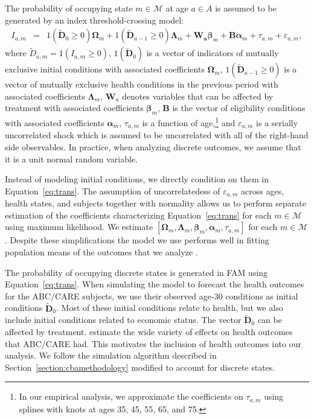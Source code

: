 The probability of occupying state $m \in \mathcal{M}$ at age $a \in{A}$ is assumed to be generated by an index threshold-crossing model:
\begin{eqnarray}
I_{a,m} &=&  \bm{\mathit{1}} \left( \tilde{\bm{D}}_{0} \geq 0 \right) \bm{\Omega}_{m} + \bm{\mathit{1}} \left( \tilde{\bm{D}}_{a-1} \geq 0\right) \bm{\Lambda}_{m} + \bm{W_a} \bm{\beta}_{m} + \bm{B} \bm{\alpha}_m + \tau_{a,m} + \varepsilon_{a,m}, \label{eq:trans}
\end{eqnarray}
where $\tilde{D}_{a,m} = \bm{\mathit{1}}  \left( I_{a,m} \geq 0 \right)$, $\bm{\mathit{1}} \left( \tilde{\bm{D}}_{0} \right)$ is a vector of indicators of mutually exclusive initial conditions with associated coefficients $\bm{\Omega}_{m}$, $ \bm{\mathit{1}} \left( \tilde{\bm{D}}_{a-1} \geq 0\right)$ is a vector of mutually exclusive health conditions in the previous period with associated coefficients $\bm{\Lambda}_{m}$, $\bm{W}_a$ denotes variables that can be affected by treatment with associated coefficients $\bm{\beta}_{m}$, $\bm{B}$ is the vector of eligibility conditions with associated coefficients $\bm{\alpha}_m$, $\tau_{a,m}$ is a function of age,\footnote{In our empirical analysis, we approximate the coefficients on $\tau_{a,m}$ using splines with knots at ages 35, 45, 55, 65, and 75.} and $\varepsilon_{a,m}$ is a serially uncorrelated shock which is assumed to be uncorrelated with all of the right-hand side observables. In practice, when analyzing discrete outcomes, we assume that it is a unit normal random variable.

Instead of modeling initial conditions, we directly condition on them in Equation~\eqref{eq:trans}. The assumption of uncorrelatedess of $\varepsilon_{a,m}$ across ages, health states, and subjects together with normality allows us to perform separate estimation of the coefficients characterizing Equation~\eqref{eq:trans} for each $m \in \mathcal{M}$ using maximum likelihood. We estimate $\left[   \bm{\Omega}_{m}, \bm{\Lambda}_{m}, \bm{\beta}_{m}, \bm{\alpha}_{m}, \tau_{a,m}  \right]$ for each $m \in \mathcal{M}$. Despite these simplifications the model we use performs well in fitting population means of the outcomes that we analyze \citep[see][]{Goldman_etal_2015_Future-Adult-Model}. 

The probability of occupying discrete states is generated in FAM using Equation~\eqref{eq:trans}. When simulating the model to forecast the health outcomes for the ABC/CARE subjects, we use their observed age-30 conditions as initial conditions  $\tilde{\bm{D}}_0$. Most of these initial conditions relate to health, but we also include initial conditions related to economic status. The vector $\tilde{\bm{D}}_0$ can be affected by treatment. \citet{Campbell_Conti_etal_2014_EarlyChildhoodInvestments} estimate the wide variety of effects on health outcomes that ABC/CARE had. This motivates the inclusion of health outcomes into our analysis. We follow the simulation algorithm described in Section~\ref{section:cbamethodology} modified to account for discrete states.

